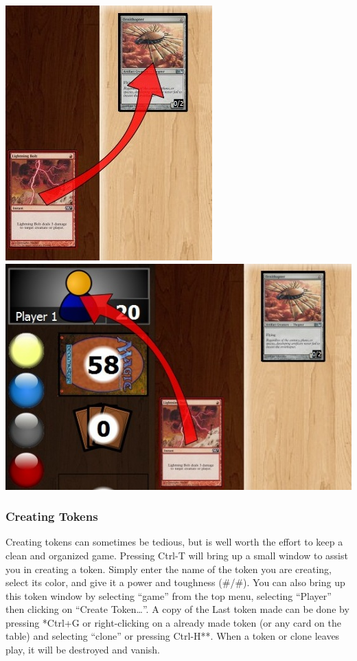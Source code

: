 \documentclass[a4paper]{scrbook}
\begin{document}
\begin{center}
\includegraphics[scale=0.5]{pics/fetch98fd} \\
\includegraphics[scale=0.5]{pics/fetch74b2}
\end{center}

\subsubsection{Creating Tokens}
Creating tokens can sometimes be tedious, but is well worth the effort to keep a clean and organized game. Pressing Ctrl-T will bring up a small window to assist you in creating a token. Simply enter the name of the token you are creating, select its color, and give it a power and toughness (\#/\#). You can also bring up this token window by selecting “game” from the top menu, selecting “Player” then clicking on “Create Token…”. A copy of the Last token made can be done by pressing *Ctrl+G or right-clicking on a already made token (or any card on the table) and selecting “clone” or pressing Ctrl-H**. When a token or clone leaves play, it will be destroyed and vanish.
\end{document}
